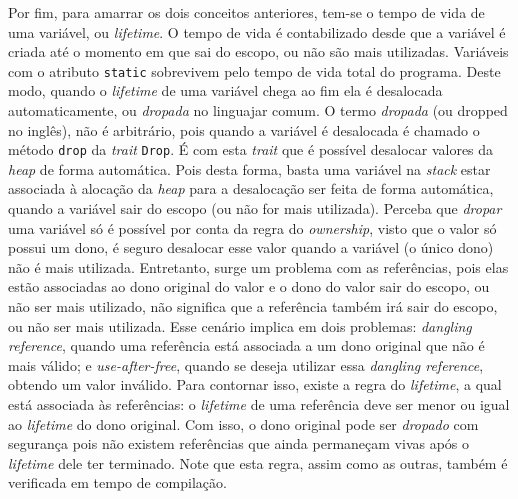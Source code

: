 Por fim, para amarrar os dois conceitos anteriores, tem-se o tempo de vida de uma variável, ou \textit{lifetime}. O tempo de vida é contabilizado desde que a variável é criada até o momento em que sai do escopo, ou não são mais utilizadas. Variáveis com o atributo \texttt{static} sobrevivem pelo tempo de vida total do programa. Deste modo, quando o \textit{lifetime} de uma variável chega ao fim ela é desalocada automaticamente, ou \textit{dropada} no linguajar comum. O termo \textit{dropada} (ou dropped no inglês), não é arbitrário, pois quando a variável é desalocada é chamado o método \texttt{drop} da \textit{trait} \texttt{Drop}. É com esta \textit{trait} que é possível desalocar valores da \textit{heap} de forma automática. Pois desta forma, basta uma variável na \textit{stack} estar associada à alocação da \textit{heap} para a desalocação ser feita de forma automática, quando a variável sair do escopo (ou não for mais utilizada). Perceba que \textit{dropar} uma variável só é possível por conta da regra do \textit{ownership}, visto que o valor só possui um dono, é seguro desalocar esse valor quando a variável (o único dono) não é mais utilizada. Entretanto, surge um problema com as referências, pois elas estão associadas ao dono original do valor e o dono do valor sair do escopo, ou não ser mais utilizado, não significa que a referência também irá sair do escopo, ou não ser mais utilizada. Esse cenário implica em dois problemas: \textit{dangling reference}, quando uma referência está associada a um dono original que não é mais válido; e \textit{use-after-free}, quando se deseja utilizar essa \textit{dangling reference}, obtendo um valor inválido. Para contornar isso, existe a regra do \textit{lifetime}, a qual está associada às referências: o \textit{lifetime} de uma referência deve ser menor ou igual ao \textit{lifetime} do dono original. Com isso, o dono original pode ser \textit{dropado} com segurança pois não existem referências que ainda permaneçam vivas após o \textit{lifetime} dele ter terminado. Note que esta regra, assim como as outras, também é verificada em tempo de compilação.


